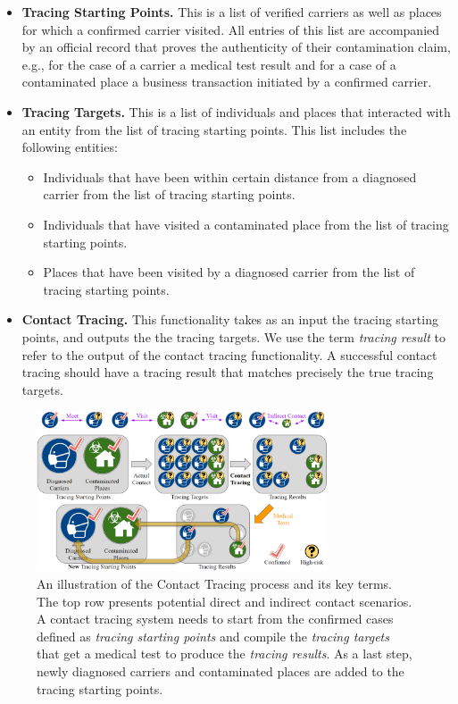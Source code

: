 \documentclass[11pt]{article}  %
\begin{document}
\begin{itemize}
    \item \textbf{Tracing Starting Points.} This is a list of verified carriers as well as places for which a confirmed carrier visited. All entries of this list are accompanied by an official record that proves the authenticity of their contamination claim, e.g., for the case of a carrier a medical test result and for a case of a contaminated place a business transaction initiated by a confirmed carrier. 
    \item \textbf{Tracing Targets.} This is a list of individuals and places that interacted with an entity from the list of tracing starting points. This list includes the following entities:
    \begin{itemize}
        \item Individuals that have been within certain distance from a diagnosed carrier from the list of tracing starting points.
        \item Individuals that have visited a contaminated place from the list of tracing starting points.
        \item Places that have been visited by a diagnosed carrier from the list of tracing starting points.
    \end{itemize}
    \item \textbf{Contact Tracing.} This functionality takes as an input the tracing starting points, and outputs the the tracing targets. We use the term \emph{tracing result} to refer to the output of the contact tracing functionality. A successful contact tracing should have a tracing result that matches precisely the true tracing targets.
\end{itemize}

\begin{figure}
\centering
\includegraphics[width=0.77\textwidth, bb= 0 0 1829 1005]{figs/pdef.png}
\caption{An illustration of the Contact Tracing process and its key terms. The top row presents potential direct and indirect contact scenarios. 
A contact tracing system needs to start from the confirmed cases defined as \emph{tracing starting points} and  compile the \emph{tracing targets} that get a medical test to produce the \emph{tracing results}. As a last step, newly diagnosed carriers and contaminated places are added to the tracing starting points.}
\label{problemdef}
\end{figure}
\end{document}
